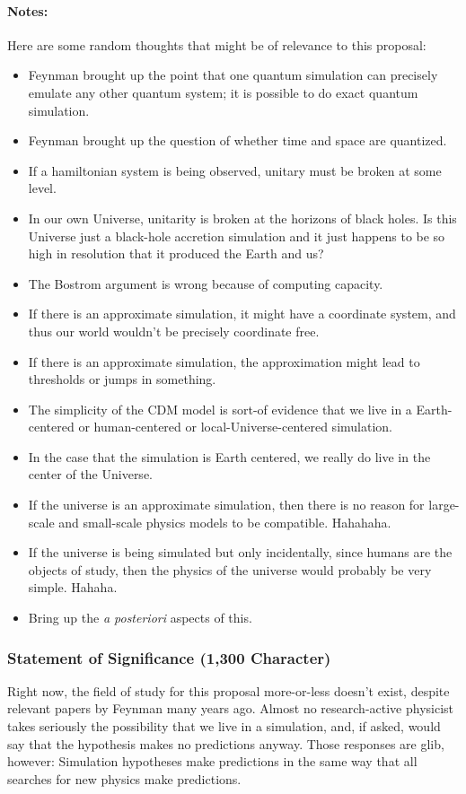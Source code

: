 \documentclass[12pt]{article}
\begin{document}
\paragraph{Notes:}
Here are some random thoughts that might be of relevance to this proposal:
\begin{itemize}
\item Feynman brought up the point that one quantum simulation can precisely emulate any other quantum system; it is possible to do exact quantum simulation.
\item Feynman brought up the question of whether time and space are quantized.
\item If a hamiltonian system is being observed, unitary must be broken at some level.
\item In our own Universe, unitarity is broken at the horizons of black holes. Is this Universe just a black-hole accretion simulation and it just happens to be so high in resolution that it produced the Earth and us?
\item The Bostrom argument is wrong because of computing capacity.
\item If there is an approximate simulation, it might have a coordinate system, and thus our world wouldn't be precisely coordinate free.
\item If there is an approximate simulation, the approximation might lead to thresholds or jumps in something.
\item The simplicity of the CDM model is sort-of evidence that we live in a Earth-centered or human-centered or local-Universe-centered simulation.
\item In the case that the simulation is Earth centered, we really do live in the center of the Universe.
\item If the universe is an approximate simulation, then there is no reason for large-scale and small-scale physics models to be compatible. Hahahaha.
\item If the universe is being simulated but only incidentally, since humans are the objects of study, then the physics of the universe would probably be very simple. Hahaha.
\item Bring up the \textsl{a posteriori} aspects of this.
\end{itemize}

\subsubsection*{Statement of Significance (1,300 Character)}
Right now, the field of study for this proposal more-or-less doesn't exist, despite relevant papers by Feynman many years ago.
Almost no research-active physicist takes seriously the possibility that we live in a simulation, and, if asked, would say that the hypothesis makes no predictions anyway.
Those responses are glib, however:
Simulation hypotheses make predictions in the same way that all searches for new physics make predictions.
\end{document}
